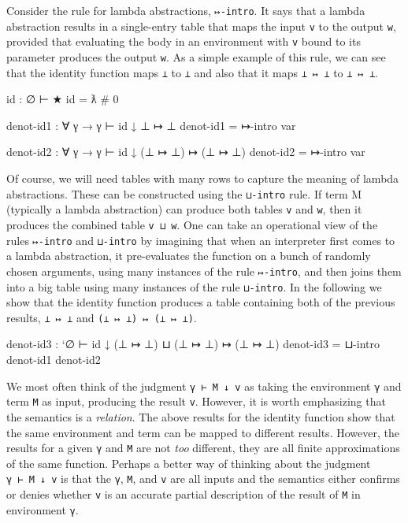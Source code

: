 Consider the rule for lambda abstractions, \texttt{↦-intro}. It says
that a lambda abstraction results in a single-entry table that maps the
input \texttt{v} to the output \texttt{w}, provided that evaluating the
body in an environment with \texttt{v} bound to its parameter produces
the output \texttt{w}. As a simple example of this rule, we can see that
the identity function maps \texttt{⊥} to \texttt{⊥} and also that it
maps \texttt{⊥\ ↦\ ⊥} to \texttt{⊥\ ↦\ ⊥}.

\begin{fence}
\begin{code}
id : ∅ ⊢ ★
id = ƛ # 0
\end{code}
\end{fence}

\begin{fence}
\begin{code}
denot-id1 : ∀ {γ} → γ ⊢ id ↓ ⊥ ↦ ⊥
denot-id1 = ↦-intro var

denot-id2 : ∀ {γ} → γ ⊢ id ↓ (⊥ ↦ ⊥) ↦ (⊥ ↦ ⊥)
denot-id2 = ↦-intro var
\end{code}
\end{fence}

Of course, we will need tables with many rows to capture the meaning of
lambda abstractions. These can be constructed using the \texttt{⊔-intro}
rule. If term M (typically a lambda abstraction) can produce both tables
\texttt{v} and \texttt{w}, then it produces the combined table
\texttt{v\ ⊔\ w}. One can take an operational view of the rules
\texttt{↦-intro} and \texttt{⊔-intro} by imagining that when an
interpreter first comes to a lambda abstraction, it pre-evaluates the
function on a bunch of randomly chosen arguments, using many instances
of the rule \texttt{↦-intro}, and then joins them into a big table using
many instances of the rule \texttt{⊔-intro}. In the following we show
that the identity function produces a table containing both of the
previous results, \texttt{⊥\ ↦\ ⊥} and \texttt{(⊥\ ↦\ ⊥)\ ↦\ (⊥\ ↦\ ⊥)}.

\begin{fence}
\begin{code}
denot-id3 : `∅ ⊢ id ↓ (⊥ ↦ ⊥) ⊔ (⊥ ↦ ⊥) ↦ (⊥ ↦ ⊥)
denot-id3 = ⊔-intro denot-id1 denot-id2
\end{code}
\end{fence}

We most often think of the judgment \texttt{γ\ ⊢\ M\ ↓\ v} as taking the
environment \texttt{γ} and term \texttt{M} as input, producing the
result \texttt{v}. However, it is worth emphasizing that the semantics
is a \emph{relation}. The above results for the identity function show
that the same environment and term can be mapped to different results.
However, the results for a given \texttt{γ} and \texttt{M} are not
\emph{too} different, they are all finite approximations of the same
function. Perhaps a better way of thinking about the judgment
\texttt{γ\ ⊢\ M\ ↓\ v} is that the \texttt{γ}, \texttt{M}, and
\texttt{v} are all inputs and the semantics either confirms or denies
whether \texttt{v} is an accurate partial description of the result of
\texttt{M} in environment \texttt{γ}.

